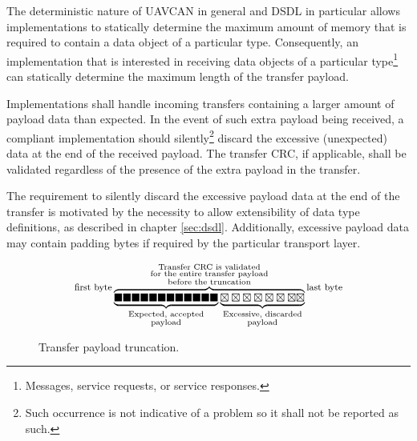 The deterministic nature of UAVCAN in general and DSDL in particular allows implementations to statically determine the
maximum amount of memory that is required to contain a data object of a particular type.
Consequently, an implementation that is interested in receiving data objects of a particular type\footnote{%
    Messages, service requests, or service responses.
}
can statically determine the maximum length of the transfer payload.

Implementations shall handle incoming transfers containing a larger amount of payload data than expected.
In the event of such extra payload being received, a compliant implementation should silently\footnote{%
    Such occurrence is not indicative of a problem so it shall not be reported as such.
}
discard the excessive (unexpected) data at the end of the received payload.
The transfer CRC, if applicable, shall be validated regardless of the presence of the extra payload in the transfer.

The requirement to silently discard the excessive payload data at the end of the transfer is motivated by
the necessity to allow extensibility of data type definitions, as described in chapter \ref{sec:dsdl}.
Additionally, excessive payload data may contain padding bytes if required by the particular transport layer.

\begin{figure}[H]
    $$
    \raisebox{1em}{\footnotesize{\text{first byte}}}
    \overbrace{%
        \underbrace{\huge{%
            \blacksquare\blacksquare\blacksquare\blacksquare\blacksquare\blacksquare%
            \blacksquare\blacksquare\blacksquare\blacksquare\blacksquare\blacksquare%
        }}_{\substack{\text{Expected, accepted} \\ \text{payload}}}%
        \underbrace{\huge{%
            \boxtimes\boxtimes\boxtimes\boxtimes\boxtimes\boxtimes\boxtimes\boxtimes%
        }}_{\substack{\text{Excessive, discarded} \\ \text{payload}}}%
    }^{\substack{%
        \text{Transfer CRC is validated} \\
        \text{for the entire transfer payload} \\
        \text{before the truncation}}
    }
    \raisebox{1em}{\footnotesize{\text{last byte}}}
    $$
    \caption{Transfer payload truncation.\label{fig:transport_payload_truncation}}
\end{figure}

